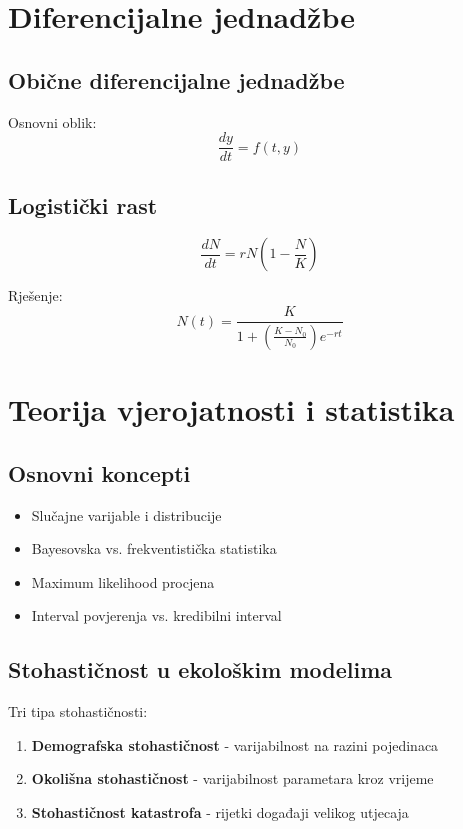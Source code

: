 \documentclass[12pt,a4paper,twoside]{book}
\begin{document}
	\section{Diferencijalne jednadžbe}
	
	\subsection{Obične diferencijalne jednadžbe}
	Osnovni oblik:
	\begin{equation}
		\frac{dy}{dt} = f(t, y)
	\end{equation}
	
	\subsection{Logistički rast}
	\begin{equation}
		\frac{dN}{dt} = rN\left(1 - \frac{N}{K}\right)
	\end{equation}
	
	Rješenje:
	\begin{equation}
		N(t) = \frac{K}{1 + \left(\frac{K-N_0}{N_0}\right)e^{-rt}}
	\end{equation}
	
	\section{Teorija vjerojatnosti i statistika}
	
	\subsection{Osnovni koncepti}
	\begin{itemize}
		\item Slučajne varijable i distribucije
		\item Bayesovska vs. frekventistička statistika
		\item Maximum likelihood procjena
		\item Interval povjerenja vs. kredibilni interval
	\end{itemize}
	
	\subsection{Stohastičnost u ekološkim modelima}
	Tri tipa stohastičnosti:
	\begin{enumerate}
		\item \textbf{Demografska stohastičnost} - varijabilnost na razini pojedinaca
		\item \textbf{Okolišna stohastičnost} - varijabilnost parametara kroz vrijeme
		\item \textbf{Stohastičnost katastrofa} - rijetki događaji velikog utjecaja
	\end{enumerate}
	
\end{document}

